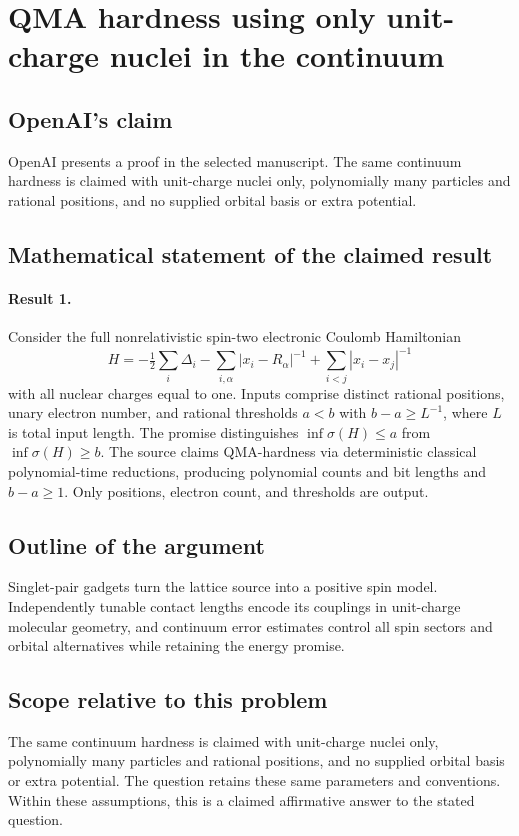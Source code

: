 \documentclass[11pt]{article}
\begin{document}
\section*{QMA hardness using only unit-charge nuclei in the continuum}

\subsection{OpenAI's claim}
OpenAI presents a proof in the selected manuscript. The same continuum hardness is claimed with unit-charge nuclei only, polynomially many particles and rational positions, and no supplied orbital basis or extra potential.

\subsection{Mathematical statement of the claimed result}
\paragraph{Result 1.} Consider the full nonrelativistic spin-two electronic Coulomb Hamiltonian
\[
 H=-\tfrac12\sum_i\Delta_i-\sum_{i,\alpha}|x_i-R_\alpha|^{-1}
 +\sum_{i<j}|x_i-x_j|^{-1}
\]
with all nuclear charges equal to one. Inputs comprise distinct rational positions, unary electron number, and rational thresholds \(a<b\) with \(b-a\ge L^{-1}\), where \(L\) is total input length. The promise distinguishes \(\inf\sigma(H)\le a\) from \(\inf\sigma(H)\ge b\). The source claims QMA-hardness via deterministic classical polynomial-time reductions, producing polynomial counts and bit lengths and \(b-a\ge1\). Only positions, electron count, and thresholds are output.

\subsection{Outline of the argument}
Singlet-pair gadgets turn the lattice source into a positive spin model. Independently tunable contact lengths encode its couplings in unit-charge molecular geometry, and continuum error estimates control all spin sectors and orbital alternatives while retaining the energy promise.

\subsection{Scope relative to this problem}
The same continuum hardness is claimed with unit-charge nuclei only, polynomially many particles and rational positions, and no supplied orbital basis or extra potential. The question retains these same parameters and conventions. Within these assumptions, this is a claimed affirmative answer to the stated question.
\end{document}
